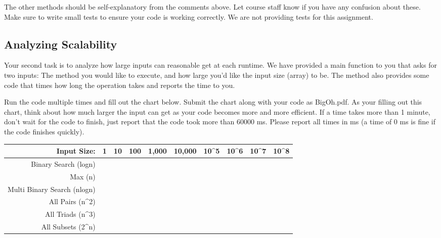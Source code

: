 \documentclass[paper=a4, fontsize=11pt, parskip=full]{scrartcl} %
\numberwithin{equation}{section} %
\numberwithin{figure}{section} %
\numberwithin{table}{section} %
\begin{document}
The other methods should be self-explanatory from the comments above. Let course staff know if you have any confusion about these. Make sure to write small tests to ensure your code is working correctly. We are not providing tests for this assignment.


\subsection{Analyzing Scalability}

Your second task is to analyze how large inputs can reasonable get at each runtime. We have provided a main function to you that asks for two inputs: The method you would like to execute, and how large you'd like the input size (array) to be. The method also provides some code that times how long the operation takes and reports the time to you.

Run the code multiple times and fill out the chart below. Submit the chart along with your code as BigOh.pdf. As your filling out this chart, think about how much larger the input can get as your code becomes more and more efficient. If a time takes more than 1 minute, don't wait for the code to finish, just report that the code took more than 60000 ms. Please report all times in ms (a time of 0 ms is fine if the code finishes quickly). 

\renewcommand{\arraystretch}{2.0}
\begin{tabular}{|r|l|l|l|l|l|l|l|l|l|}
\hline
Input Size:                        & 1 & 10 & 100 & 1,000 & 10,000 & 10\textasciicircum{}5 & 10\textasciicircum{}6 & 10\textasciicircum{}7 & 10\textasciicircum{}8 \\ \hline
Binary Search (logn)               &   &    &     &       &        &                       &                       &                       &                       \\ \hline
Max (n)                            &   &    &     &       &        &                       &                       &                       &                       \\ \hline
Multi Binary Search (nlogn)        &   &    &     &       &        &                       &                       &                       &                       \\ \hline
All Pairs (n\textasciicircum{}2)   &   &    &     &       &        &                       &                       &                       &                       \\ \hline
All Triads (n\textasciicircum{}3)  &   &    &     &       &        &                       &                       &                       &                       \\ \hline
All Subsets (2\textasciicircum{}n) &   &    &     &       &        &                       &                       &                       &                       \\ \hline
\end{tabular}
\end{document}

